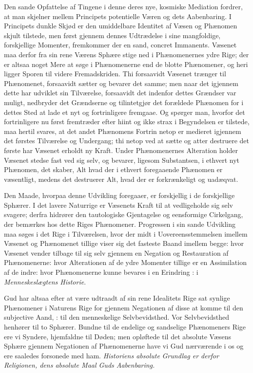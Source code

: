 \documentclass[12pt]{book}
\newcommand{\dsi}{\reflectbox{c}:}
\newcommand{\opage}[1]{\marginnote{\footnotesize\textit{[#1]}}}
\begin{document}
Den sande Opfattelse af Tingene i denne deres nye, kosmiske Mediation fordrer,
at man skjelner mellem Principets potentielle Væren og dets Aabenbaring. I
Principets dunkle Skjød er den umiddelbare Identitet af Væsen og Phænomen
skjult tilstede, men først gjennem dennes Udtrædelse i sine mangfoldige,
forskjellige Momenter, fremkommer der en sand, concret Immanents. Væsenet maa
derfor fra sin rene Værens Sphære stige ned i Phænomenernes ydre Rige; der er
altsaa noget Mere at søge i Phænomenerne end de blotte Phænomener, og heri
ligger Sporen til videre Fremadskriden. Thi forsaavidt Væsenet trænger til
Phænomenet, forsaavidt sætter og bevarer det samme; men naar det igjennem dette
har udviklet sin Tilværelse, forsaavidt det indenfor dettes Grændser var
muligt, nedbryder det Grændserne og tilintetgjør det forældede Phænomen for i
dettes Sted at lade et nyt og fortrinligere
\opage{127} fremgaae. Og spørger man, hvorfor det fortrinligere nu først fremtræder efter
hiint og ikke strax i Begyndelsen er tilstede, maa hertil svares, at det andet
Phænomens Fortrin netop er medieret igjennem det førstes Tilværelse og
Undergang; thi netop ved at sætte og atter destruere det første har Væsenet
erholdt ny Kraft. Under Phænomenernes Alteration holder Væsenet stedse fast ved
sig selv, og bevarer, ligesom Substantsen, i ethvert nyt Phænomen, det skaber,
Alt hvad der i ethvert foregaaende Phænomen er væsentligt, medens det
destruerer Alt, hvad der er forkrænkeligt og uadæqvat.

Den Maade, hvorpaa denne Udvikling foregaaer, er forskjellig i de forskjellige
Sphærer. I det lavere Naturrige er Væsenets Kraft til at vedligeholde sig selv
svagere; derfra hidrører den tautologiske Gjentagelse og eensformige
Cirkelgang, der bemærkes hos dette Riges Phænomener. Progressen i sin sande
Udvikling maa søges i det Rige i Tilværelsen, hvor der midt i
Uovereensstemmelsen imellem Væsenet og Phænomenet tillige viser sig det fasteste
Baand imellem begge: hvor Væsenet vender tilbage til sig selv gjennem en
Negation og Restauration af Phænomenerne: hvor Alterationen af de ydre Momenter
tillige er en Assimilation af de indre: hvor Phænomenerne kunne bevares i en
Erindring \dsi{} i \emph{Menneskeslægtens Historie}.

Gud har altsaa efter at være udtraadt af sin rene Idealitets Rige sat synlige
Phænomener i Naturens Rige for gjennem Negationen af disse at komme til den
subjective Aand, \dsi{} til den menneskelige Selvbevidsthed. Vor Selvbevidsthed
henhører til to Sphærer. Bundne til de endelige og sandselige Phænomeners Rige
ere vi Syndere, hjemfaldne til Døden; men opløftede til det absolute Væsens
Sphære gjennem Negationen af Phænomenerne have vi Gud nærværende i os og ere
saaledes forsonede med ham. \emph{Historiens absolute}
\opage{128} \emph{Grundlag er derfor Religionen, dens absolute Maal Guds Aabenbaring.}
\end{document}

